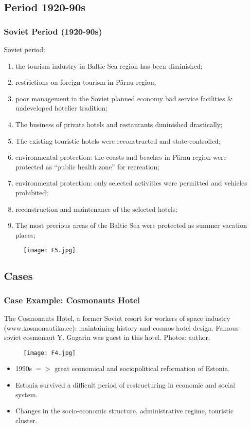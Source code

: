 \documentclass[pdflatex,compress,8pt,
	xcolor={dvipsnames,dvipsnames,svgnames,x11names,table},
]{beamer}
\begin{document}
\subsection{Period 1920-90s}
\begin{frame}\frametitle{Soviet Period (1920-90s)}
Soviet period:
\begin{enumerate}
	\item the tourism industry in Baltic Sea region has been diminished;
	\item restrictions on foreign tourism in Pärnu region;
	\item poor management in the Soviet planned economy bad service facilities \& undeveloped hotelier tradition;
	\item The business of private hotels and restaurants diminished drastically;
	\item The existing touristic hotels were reconstructed and state-controlled;
	\item environmental protection: the coasts and beaches in Pärnu region were protected as “public health zone” for recreation;
	\item environmental protection: only selected activities were permitted and vehicles prohibited;
	\item reconstruction and maintenance of the selected hotels;
	\item The most precious areas of the Baltic Sea were protected as summer vacation places;
\end{enumerate}
\begin{figure}[H]
	\centering
		\texttt{[image: F5.jpg]}
\end{figure}
\end{frame} 

\subsection{Cases}
\begin{frame}\frametitle{Case Example: Cosmonauts Hotel}
The Cosmonauts Hotel, a former Soviet resort for workers of space industry (www.kosmonautika.ee): maintaining history and cosmos hotel design. Famous soviet cosmonaut Y. Gagarin was guest in this hotel. Photos: author.
\begin{figure}[H]
	\centering
		\texttt{[image: F4.jpg]}
\end{figure}
\begin{itemize}
	\item 1990s $=>$ great economical and sociopolitical reformation of Estonia.
	\item Estonia survived a difficult period of restructuring in economic and social system.
	\item Changes in the socio-economic structure, administrative regime, touristic cluster.
\end{itemize}
\end{frame} 
\end{document}
